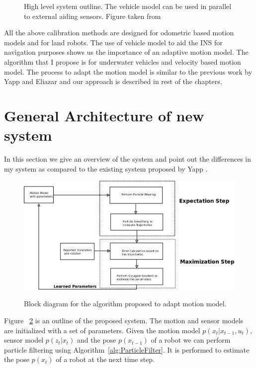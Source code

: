 \documentclass[12pt]{dalcsthesis}
\begin{document}
\begin{figure}
  \centering
  \qquad
 
  \caption{\label{fig-INS systems}High level system outline. The vehicle model can be used in parallel to external aiding sensors. Figure taken from \cite{Hegrenæs2008}}
\end{figure}

All the above calibration methods are designed for odometric based motion models and for land robots. The use of vehicle model to aid the INS for navigation purposes shows us the importance of an adaptive motion model. The algorithm that I propose is for underwater vehicles and velocity based motion model. The process to adapt the motion model is similar to the previous work by Yapp and Eliazar and our approach is described in rest of the chapters.

\section{General Architecture of new system}
In this section we give an overview of the system and point out the differences in my system as compared to the existing system proposed by Yapp \cite{Yap2008}. 
\begin{figure}
  \centering
     {\includegraphics[height = 3.0 in]{Diagram1.jpeg}}
  \caption{\label{fig-General Architecture} Block diagram for the algorithm proposed to adapt motion model.}
\end{figure}
Figure ~\ref{fig-General Architecture} is an outline of the proposed system. The motion and sensor models are initialized with a set of parameters. Given the motion model $p(x_{t}|x_{t-1},u_{t})$, sensor model $p(z_{t}|x_{t})$ and the pose $p(x_{t-1})$ of a robot we can perform particle filtering using Algorithm~\ref{alg:ParticleFilter}. It is performed to estimate the pose $p(x_{t})$ of a robot at the next time step. 
\end{document}
